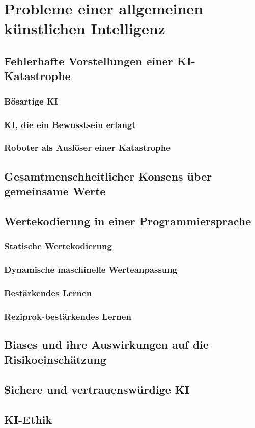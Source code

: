 \chapter{Probleme einer allgemeinen künstlichen Intelligenz}
\section{Fehlerhafte Vorstellungen einer KI-Katastrophe}
\subsection{Bösartige KI}
\subsection{KI, die ein Bewusstsein erlangt}
\subsection{Roboter als Auslöser einer Katastrophe}
\section{Gesamtmenschheitlicher Konsens über gemeinsame Werte}
\section{Wertekodierung in einer Programmiersprache}
\subsection{Statische Wertekodierung}
\subsection{Dynamische maschinelle Werteanpassung}
\subsection{Bestärkendes Lernen}
\subsection{Reziprok-bestärkendes Lernen}
\section{Biases und ihre Auswirkungen auf die Risikoeinschätzung}
\section{Sichere und vertrauenswürdige KI}
\section{KI-Ethik}
